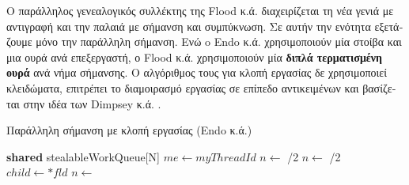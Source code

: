 \begin{greek}
Ο παράλληλος γενεαλογικός συλλέκτης της Flood κ.ά. \cite{DBLP:conf/jvm/FloodDSZ01}
διαχειρίζεται τη νέα γενιά με αντιγραφή και την παλαιά με
σήμανση και συμπύκνωση. Σε αυτήν την ενότητα εξετάζουμε μόνο
την παράλληλη σήμανση. Ενώ o Endo κ.ά. χρησιμοποιούν μία στοίβα
και μια ουρά ανά επεξεργαστή, ο Flood κ.ά. χρησιμοποιούν μία
\textbf{διπλά τερματισμένη ουρά} ανά νήμα σήμανσης.
Ο αλγόριθμος τους για κλοπή εργασίας δε χρησιμοποιεί κλειδώματα,
επιτρέπει το διαμοιρασμό εργασίας σε επίπεδο αντικειμένων και
βασίζεται στην ιδέα των Dimpsey κ.ά. \cite{DBLP:journals/ibmsj/DimpseyAK00}.

\begin{algorithm}
  \caption{Παράλληλη σήμανση με κλοπή εργασίας (Endo κ.ά.)}
  \label{alg:par_2}
  \begin{algorithmic}[1]
    \State \textbf{shared} \; stealableWorkQueue[N] 
    \State $me \gets myThreadId$
    \Statex
        \State \Return{\null}
      \EndIf
      \State {}
      \State $n \gets$ /2 
      \State {}
      \State {}
              \State $n \gets$ /2 
              \State {}
              \State {}
              \State \Return{\null}
            \EndIf
          \EndIf
        \EndFor
      \EndIf 
    \EndProcedure
    \Statex  
          \State $child \gets *fld$
            \State {}
            \State {}
          \EndIf
        \EndFor
      \EndWhile
    \EndProcedure
    \Statex
     
        \State $n \gets$ 
        \State {}
        \State {}
        \State {}
      \EndIf
    \EndProcedure
  \end{algorithmic}
\end{algorithm}


\end{greek}
